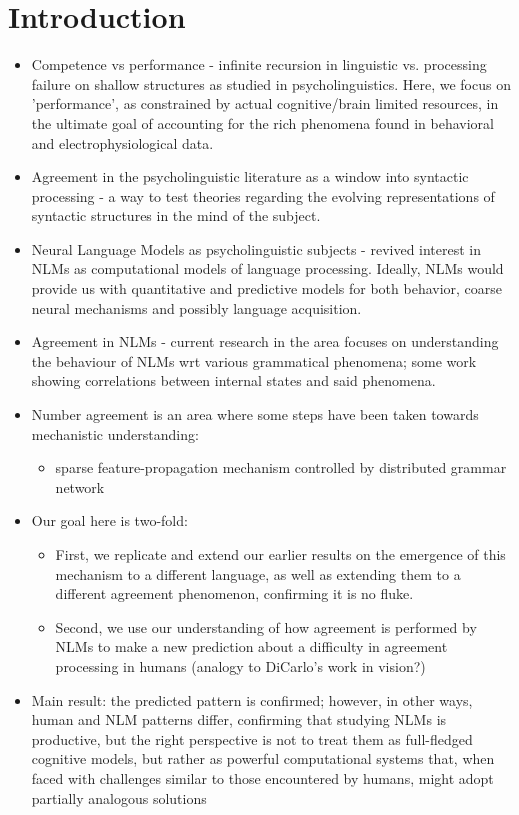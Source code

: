 \section{Introduction}

\begin{itemize}
\item Competence vs performance - infinite recursion in linguistic vs. processing failure on shallow structures as studied in psycholinguistics. Here, we focus on 'performance', as constrained by actual cognitive/brain limited resources, in the ultimate goal of accounting for the rich phenomena found in behavioral and electrophysiological data.
\item Agreement in the psycholinguistic literature as a window into syntactic processing - a way to test theories regarding the evolving representations of syntactic structures in the mind of the subject. 
\item Neural Language Models as psycholinguistic subjects - revived interest in  NLMs as computational models of language processing. Ideally, NLMs would provide us with quantitative and predictive models for both behavior, coarse neural mechanisms and possibly language acquisition. 
\item Agreement in NLMs - current research in the area focuses on understanding the behaviour of NLMs wrt various grammatical phenomena; some work showing correlations between internal states and said phenomena.
\item Number agreement is an area where some steps have been taken
  towards mechanistic understanding:
  \begin{itemize}
  \item sparse feature-propagation mechanism controlled by distributed
    grammar network
  \end{itemize}
\item Our goal here is two-fold:
  \begin{itemize}
  \item First, we replicate and extend our earlier results on the emergence of
    this mechanism to a different language, as well as extending them to a different agreement phenomenon, confirming it is no fluke.
  \item Second, we use our understanding of how agreement is
    performed by NLMs to make a new prediction about a difficulty in agreement
    processing in humans (analogy to DiCarlo's work in vision?)
  \end{itemize}
\item Main result: the predicted pattern is confirmed; however, in other ways,
  human and NLM patterns differ, confirming that studying NLMs is
  productive, but the right perspective is not to treat them as
  full-fledged cognitive models, but rather as powerful computational
  systems that, when faced with challenges similar to those
  encountered by humans, might adopt partially analogous solutions
\end{itemize}
